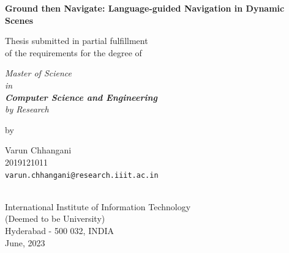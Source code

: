 \thispagestyle{empty}
\begin{center}
\vspace*{1.5cm}
{\Large \bf Ground then Navigate: Language-guided Navigation in Dynamic Scenes}

\vspace*{3.75cm}
{\large Thesis submitted in partial fulfillment\\}
{\large  of the requirements for the degree of \\}

\vspace*{1cm}
{\it {\large Master of Science \\ in \\ \textbf{Computer Science and Engineering} \\ by Research}\\}
    

\vspace*{1cm}
{\large by}

\vspace*{5mm}
{\large Varun Chhangani\\}
{\large 2019121011\\
{\small \tt varun.chhangani@research.iiit.ac.in}}


\vspace*{3.0cm}
\\
{\large International Institute of Information Technology\\}
{\large (Deemed to be University) \\}
{\large Hyderabad - 500 032, INDIA\\}
{\large June, 2023\\}
\end{center}
